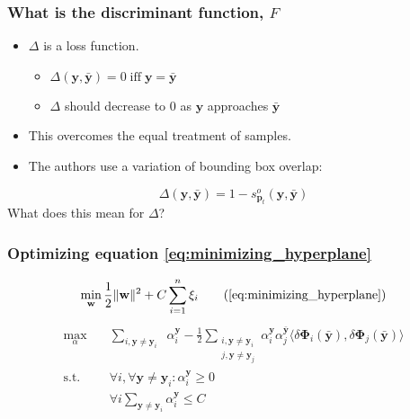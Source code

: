 \documentclass[mathserif,handout]{beamer}
\DeclareMathOperator{\struckDelta}{\Delta \left( \mathbf{y}, \mathbf{y}_i \right)}
\DeclareMathOperator{\st}{\text{s.t.} \quad}
\begin{document}
\begin{frame}
    \frametitle{What is the discriminant function, $F$}
    \begin{itemize}
        \item $\Delta$ is a loss function.
            \begin{itemize}
                \item $\Delta (\mathbf{y}, \mathbf{\bar{y}}) = 0 \; \text{iff} \; \mathbf{y} = \mathbf{\bar{y}}$
                \item $\Delta$ should decrease to 0 as $\mathbf{y}$ approaches $\mathbf{\bar{y}}$
            \end{itemize}
        \item This overcomes the equal treatment of samples.
        \item The authors use a variation of bounding box overlap:
    \end{itemize}
    \begin{equation}
        \Delta(\mathbf{y}, \mathbf{\bar{y}}) = 1 - s_{\mathbf{p}_t}^o (\mathbf{y}, \mathbf{\bar{y}})
    \end{equation}
    \alert{What does this mean for $\Delta$?}
\end{frame}

\begin{frame}
    \frametitle{Optimizing equation \eqref{eq:minimizing_hyperplane}}
    \begin{equation}
        \min_{\mathbf{w}} \frac{1}{2} \|\mathbf{w}\|^2 + C \sum_{i=1}^n \xi_i \tag{\ref{eq:minimizing_hyperplane}}
    \end{equation}
    \begin{equation}
        \begin{aligned}
            \max_{\alpha} \quad & \sum_{i, \mathbf{y} \ne \mathbf{y}_i} \struckDelta \alpha_i^\mathbf{y} -
                \frac{1}{2} \sum_{\substack{i, \mathbf{y} \ne \mathbf{y}_i \\ j, \mathbf{y} \ne \mathbf{y}_j}}
                \alpha_i^\mathbf{y} \alpha_j^\mathbf{\bar{y}} \langle \delta \mathbf{\Phi}_i \left( \mathbf{\bar{y}} \right),
                \delta \mathbf{\Phi}_j \left( \mathbf{\bar{y}} \right) \rangle \\
            \st & \forall i, \forall \mathbf{y} \ne \mathbf{y}_i : \alpha_i^\mathbf{y} \ge 0 \\
                & \forall i \sum_{\mathbf{y} \ne \mathbf{y}_i} \alpha_i^\mathbf{y} \le C
        \end{aligned}
    \end{equation}
\end{frame}
\end{document}
